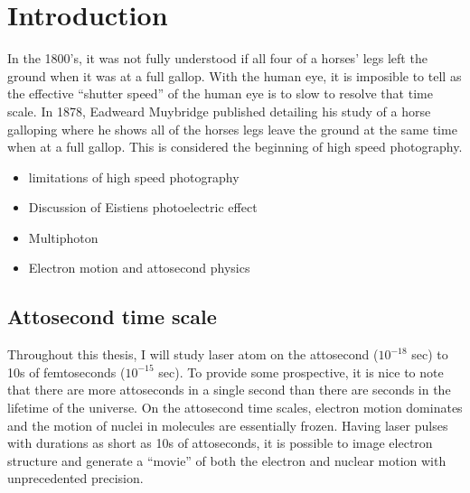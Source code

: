 \chapter{Introduction}
\label{cha:introchap}
In the 1800's, it was not fully understood if all four of a horses' legs left the ground when it was at a full gallop. With the human eye, it is imposible to tell as the effective ``shutter speed'' of the human eye is to slow to resolve that time scale. In 1878, Eadweard Muybridge published detailing his study of a horse galloping where he shows all of the horses legs leave the ground at the same time when at a full gallop. This is considered the beginning of high speed photography. 

\begin{itemize}
    \item limitations of high speed photography
    \item Discussion of Eistiens photoelectric effect
    \item Multiphoton
    \item Electron motion and attosecond physics
\end{itemize}

\section{Attosecond time scale}
Throughout this thesis, I will study laser atom on the attosecond ($10^{-18}$ sec) to 10s of femtoseconds ($10^{-15}$ sec). To provide some prospective, it is nice to note that there are more attoseconds in a single second than there are seconds in the lifetime of the universe. On the attosecond time scales, electron motion dominates and the motion of nuclei in molecules are essentially frozen. Having laser pulses with durations as short as 10s of attoseconds, it is possible to image electron structure and generate a ``movie'' of both the electron and nuclear motion with unprecedented precision. 

